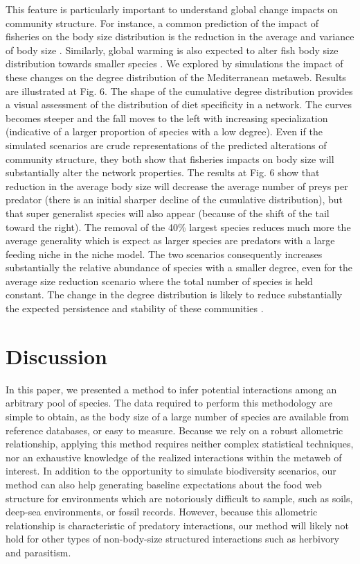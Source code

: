 \documentclass[12pt]{article}
\begin{document}
This feature is particularly important to understand global change impacts on community structure. For instance, a common prediction of the impact of fisheries on the body size distribution is the reduction in the average and variance of body size \parencite{Jackson2001}. Similarly, global warming is also expected to alter fish body size distribution towards smaller species \parencite{Cheung2012}. We explored by simulations the impact of these changes on the degree distribution of the Mediterranean metaweb. Results are illustrated at Fig. 6. The shape of the cumulative degree distribution provides a visual assessment of the distribution of diet specificity in a network. The curves becomes steeper and the fall moves to the left with increasing specialization (indicative of a larger proportion of species with a low degree). Even if the simulated scenarios are crude representations of the predicted alterations of community structure, they both show that fisheries impacts on body size will substantially alter the network properties. The results at Fig. 6 show that reduction in the average body size will decrease the average number of preys per predator (there is an initial sharper decline of the cumulative distribution), but that super generalist species will also appear (because of the shift of the tail toward the right). The removal of the 40\% largest species reduces much more the average generality which is expect as larger species are predators with a large feeding niche in the niche model. The two scenarios consequently increases substantially the relative abundance of species with a smaller degree, even for the average size reduction scenario where the total number of species is held constant. The change in the degree distribution is likely to reduce substantially the expected persistence and stability of these communities \parencite{Gravel2011a, Gravel2011b}.

\section{Discussion}

In this paper, we presented a method to infer potential interactions among an arbitrary pool of species. The data required to perform this methodology are simple to obtain, as the body size of a large number of species are available from reference databases, or easy to measure. Because we rely on a robust allometric relationship, applying this method requires neither complex statistical techniques, nor an exhaustive knowledge of the realized interactions within the metaweb of interest. In addition to the opportunity to simulate biodiversity scenarios, our method can also help generating baseline expectations about the food web structure for environments which are notoriously difficult to sample, such as soils, deep-sea environments, or fossil records. However, because this allometric relationship is characteristic of predatory interactions, our method will likely not hold for other types of non-body-size structured interactions such as herbivory and parasitism.
\end{document}
